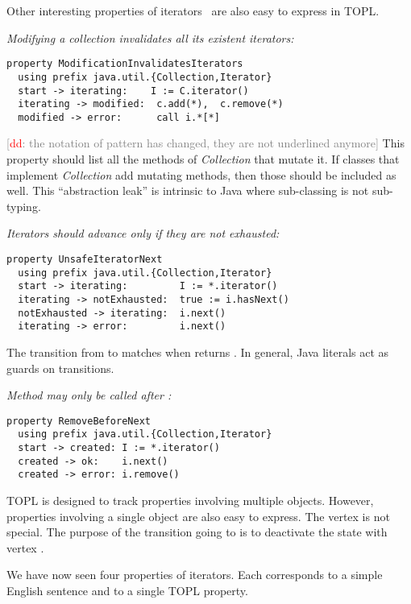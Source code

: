 \documentclass[preprint]{sigplanconf} %
\newcommand{\note}[2]{\textcolor{gray}{[\textcolor{red}{#1}: #2]}}
\newcommand{\dd}[1]{\note{dd}{#1}}
\newcommand{\delimitVerbatim}{\par\nobreak\smallskip\noindent}
\theoremstyle{definition}
\theoremstyle{remark}
\begin{document}
Other interesting properties of iterators~\cite{dblp:conf/oopsla/naeeml08,dblp:conf/sigsoft/boddenlh08,haack2009} are also easy to express in TOPL\null.

\medskip\emph{Modifying a collection invalidates all its existent iterators:}
\delimitVerbatim
\begin{Verbatim}
property ModificationInvalidatesIterators
  using prefix java.util.{Collection,Iterator}
  start -> iterating:    I := C.iterator()
  iterating -> modified:  c.add(*),  c.remove(*)
  modified -> error:      call i.*[*]
\end{Verbatim}
\delimitVerbatim
\dd{the notation of pattern has changed, they are not underlined anymore}
This property should list all the methods of \textit{Collection} that mutate it.
If classes that implement \textit{Collection} add mutating methods, then those should be included as well.
This ``abstraction leak'' is intrinsic to Java where sub-classing is not sub-typing.

\medskip\emph{Iterators should advance only if they are not exhausted:}
\delimitVerbatim
\begin{Verbatim}
property UnsafeIteratorNext
  using prefix java.util.{Collection,Iterator}
  start -> iterating:         I := *.iterator()
  iterating -> notExhausted:  true := i.hasNext()
  notExhausted -> iterating:  i.next()
  iterating -> error:         i.next()
\end{Verbatim}
\delimitVerbatim
The transition from \Verb@iterating@ to \Verb@notExhausted@ matches when \Verb@hasNext@ returns \Verb@true@.
In general, Java literals act as guards on transitions.

\medskip\emph{Method \Verb@remove@ may only be called after \Verb@next@:}
\delimitVerbatim
\begin{Verbatim}
property RemoveBeforeNext
  using prefix java.util.{Collection,Iterator}
  start -> created: I := *.iterator()
  created -> ok:    i.next()
  created -> error: i.remove()
\end{Verbatim}
\delimitVerbatim
TOPL is designed to track properties involving multiple objects.
However, properties involving a single object are also easy to express.
The vertex \Verb@ok@ is not special.
The purpose of the transition going to \Verb@ok@ is to deactivate the state with vertex \Verb@created@.

\medskip
We have now seen four properties of iterators.
Each corresponds to a simple English sentence and to a single TOPL property.
\end{document}
